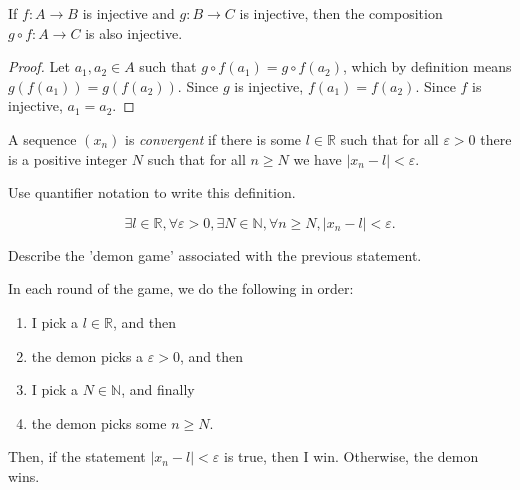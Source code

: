 \documentclass[11pt]{article}
\begin{document}
\begin{question}
    If $f: A \to B$ is injective and $g: B \to C$ is injective,
    then the composition $g \circ f : A \to C$ is also injective.
\end{question}
\begin{proof}
    Let $a_{1},a_{2} \in A$ such that $g \circ f(a_{1}) = g \circ f(a_{2})$,
    which by definition means $g(f(a_{1})) = g(f(a_{2}))$.
    Since $g$ is injective, $f(a_{1}) = f(a_{2})$.
    Since $f$ is injective, $a_{1} = a_{2}$.
\end{proof}

\newpage
\begin{question}
    A sequence $(x_n)$ is \emph{convergent} if 
    there is some $l \in \mathbb{R}$ such that for all $\varepsilon > 0$
    there is a positive integer $N$ such that
    for all $n \ge N$ we have $|x_n - l| < \varepsilon $.
\end{question}

\begin{subquestion}
    Use quantifier notation to write this definition.
\end{subquestion}
\[
\exists l\in \mathbb{R},\forall \varepsilon > 0,\exists N \in \mathbb{N},\forall n \ge N, |x_n - l| < \varepsilon.
\]
\begin{subquestion}
    Describe the 'demon game' associated with the previous statement.
\end{subquestion}

\noindent In each round of the game, we do the following in order:
\begin{enumerate}[noitemsep]
    \item I pick a $l \in \mathbb{R}$, and then
    \item the demon picks a $\varepsilon > 0$, and then
    \item I pick a $N \in \mathbb{N}$, and finally
    \item the demon picks some $n \ge N$.
\end{enumerate}
Then, if the statement $|x_n - l| < \varepsilon$ is true, 
then I win. Otherwise, the demon wins.
\end{document}
